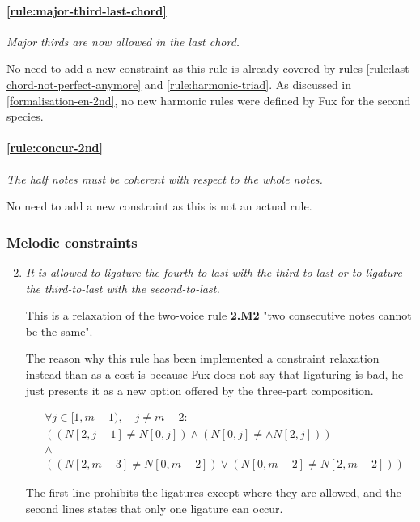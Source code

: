 \paragraph{\hspace{.5cm}\ref{rule:major-third-last-chord}} \textit{Major thirds are now allowed in the last chord.}

No need to add a new constraint as this rule is already covered by rules \ref{rule:last-chord-not-perfect-anymore} and \ref{rule:harmonic-triad}.
As discussed in \ref{formalisation-en-2nd}, no new harmonic rules were defined by Fux for the second species.

\paragraph{\hspace{.5cm}\ref{rule:concur-2nd}} \textit{The half notes must be coherent with respect to the whole notes.}

No need to add a new constraint as this is not an actual rule.

\subsubsection{Melodic constraints}
\begin{enumerate}[wide, label=\bfseries 2.M\arabic*]
\setcounter{enumi}{1} %
    \item \textit{It is allowed to ligature the fourth-to-last with the third-to-last or to ligature the third-to-last with the second-to-last.} \label{constraint:2nd-species-ligatures}  

    This is a relaxation of the two-voice rule \textbf{2.M2} "two consecutive notes cannot be the same".
    
    The reason why this rule has been implemented a constraint relaxation instead than as a cost is because Fux does not say that ligaturing is bad, he just presents it as a new option offered by the three-part composition.

    \begin{equation}
        \begin{aligned}
            &\forall j \in [1, m-1), \quad j \neq m-2:\\
            &((N[2, j-1] \neq N[0, j]) \land (N[0, j] \neq \land N[2, j])) \\
            &\land \\
            & ((N[2, m-3] \neq N[0, m-2]) \lor (N[0, m-2] \neq N[2, m-2]) )
        \end{aligned}
    \end{equation}

    The first line prohibits the ligatures except where they are allowed, and the second lines states that only one ligature can occur.
\end{enumerate}

